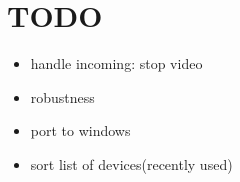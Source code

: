 \documentclass[ddc nogerman]{tudbeamer}
\begin{document}
\section{TODO}
\begin{frame}
    \begin{itemize}
        \item handle incoming: stop video
        \item robustness
        \item port to windows
        \item sort list of devices(recently used)
    \end{itemize}
\end{frame}
\end{document}
